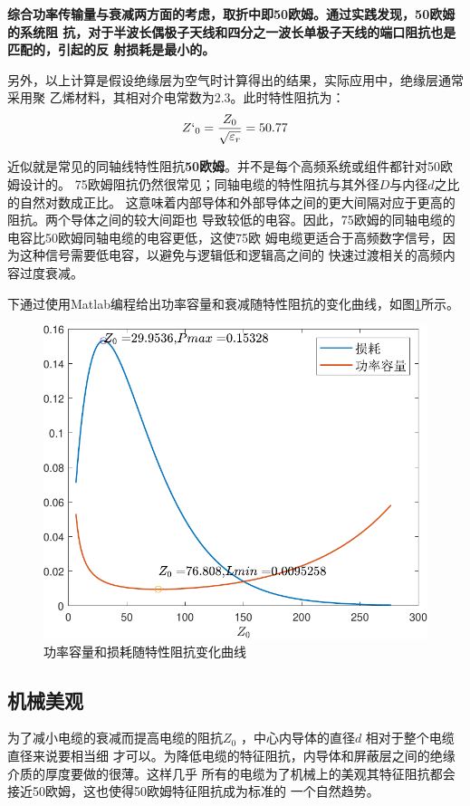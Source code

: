 \textbf{综合功率传输量与衰减两方面的考虑，取折中即50欧姆。通过实践发现，50欧姆的系统阻
    抗，对于半波长偶极子天线和四分之一波长单极子天线的端口阻抗也是匹配的，引起的反
    射损耗是最小的。}

另外，以上计算是假设绝缘层为空气时计算得出的结果，实际应用中，绝缘层通常采用聚
乙烯材料，其相对介电常数为$2.3$。此时特性阻抗为：
\begin{equation}\label{18}
    Z`_0=\dfrac{Z_0}{\sqrt{\varepsilon_r}}=50.77
\end{equation}

近似就是常见的同轴线特性阻抗\textbf{50欧姆}。并不是每个高频系统或组件都针对50欧姆设计的。
75欧姆阻抗仍然很常见；同轴电缆的特性阻抗与其外径$D$与内径$d$之比的自然对数成正比。
这意味着内部导体和外部导体之间的更大间隔对应于更高的阻抗。两个导体之间的较大间距也
导致较低的电容。因此，75欧姆的同轴电缆的电容比50欧姆同轴电缆的电容更低，这使75欧
姆电缆更适合于高频数字信号，因为这种信号需要低电容，以避免与逻辑低和逻辑高之间的
快速过渡相关的高频内容过度衰减。

下通过使用Matlab编程给出功率容量和衰减随特性阻抗的变化曲线，如图\ref{pic2-1}所示。
\begin{figure}[htbp]
    \centering
    \includegraphics[width=0.7\linewidth]{figure/microwave-crop.pdf}
    \caption{功率容量和损耗随特性阻抗变化曲线}
    \label{pic2-1}
\end{figure}
\subsection{机械美观}
为了减小电缆的衰减而提高电缆的阻抗$Z_0$ ，中心内导体的直径$d$ 相对于整个电缆直径来说要相当细
才可以。为降低电缆的特征阻抗，内导体和屏蔽层之间的绝缘介质的厚度要做的很薄。这样几乎
所有的电缆为了机械上的美观其特征阻抗都会接近50欧姆，这也使得50欧姆特征阻抗成为标准的
一个自然趋势。
